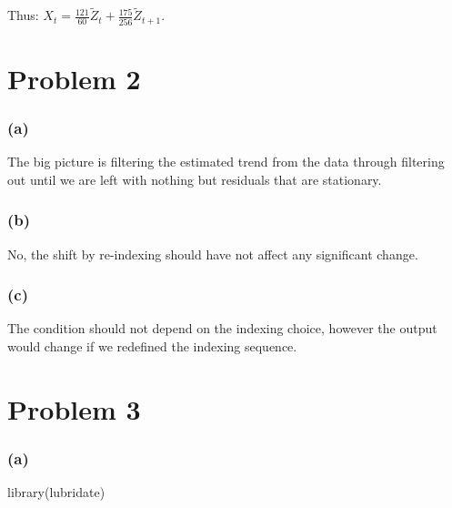 \documentclass[
]{article}
\newenvironment{Shaded}{\begin{snugshade}}{\end{snugshade}}
\newcommand{\FunctionTok}[1]{\textcolor[rgb]{0.00,0.00,0.00}{#1}}
\newcommand{\NormalTok}[1]{#1}
\begin{document}
Thus:
\(X_{t} = \frac{121}{60} \tilde{Z}_{t} + \frac{175}{256} \tilde{Z}_{t + 1}\).\\

\hypertarget{problem-2}{%
\section{Problem 2}\label{problem-2}}

\hypertarget{a-1}{%
\subsubsection{(a)}\label{a-1}}

The big picture is filtering the estimated trend from the data through
filtering out until we are left with nothing but residuals that are
stationary.\\

\hypertarget{b-1}{%
\subsubsection{(b)}\label{b-1}}

No, the shift by re-indexing should have not affect any significant
change.\\

\hypertarget{c-1}{%
\subsubsection{(c)}\label{c-1}}

The condition should not depend on the indexing choice, however the
output would change if we redefined the indexing sequence.\\

\hypertarget{problem-3}{%
\section{Problem 3}\label{problem-3}}

\hypertarget{a-2}{%
\subsubsection{(a)}\label{a-2}}

\begin{Shaded}
\begin{Highlighting}[]
\FunctionTok{library}\NormalTok{(lubridate)}
\end{Highlighting}
\end{Shaded}
\end{document}
